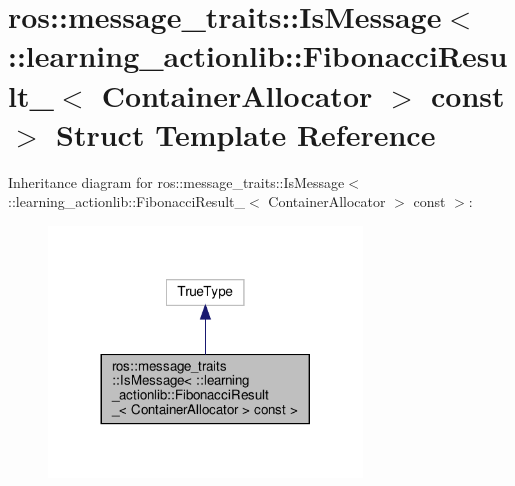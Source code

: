\hypertarget{structros_1_1message__traits_1_1IsMessage_3_01_1_1learning__actionlib_1_1FibonacciResult___3_01C22c584fb32f54aeafc4c6d8dc64d09ad}{}\section{ros\+:\+:message\+\_\+traits\+:\+:Is\+Message$<$ \+:\+:learning\+\_\+actionlib\+:\+:Fibonacci\+Result\+\_\+$<$ Container\+Allocator $>$ const $>$ Struct Template Reference}
\label{structros_1_1message__traits_1_1IsMessage_3_01_1_1learning__actionlib_1_1FibonacciResult___3_01C22c584fb32f54aeafc4c6d8dc64d09ad}


Inheritance diagram for ros\+:\+:message\+\_\+traits\+:\+:Is\+Message$<$ \+:\+:learning\+\_\+actionlib\+:\+:Fibonacci\+Result\+\_\+$<$ Container\+Allocator $>$ const $>$\+:
\nopagebreak
\begin{figure}[H]
\begin{center}
\leavevmode
\includegraphics[width=236pt]{structros_1_1message__traits_1_1IsMessage_3_01_1_1learning__actionlib_1_1FibonacciResult___3_01Cac06ec0a6a9b6fe9a268cc93d60eaf08}
\end{center}
\end{figure}



